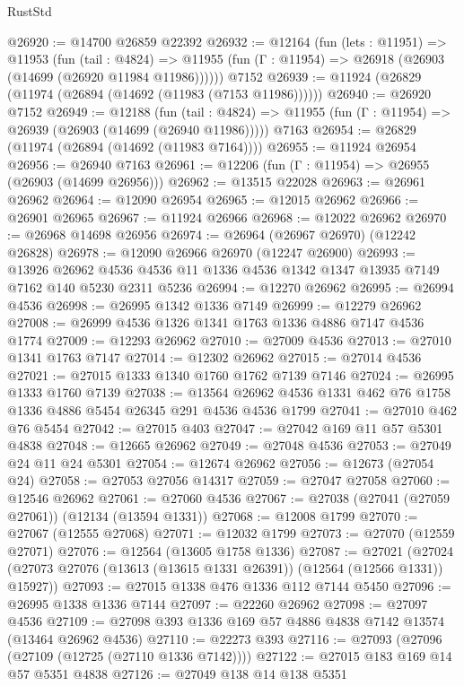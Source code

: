 \begin{lexlean}{RustStd}
\begin{coremodule}
@26920 := @14700 @26859 @22392
@26932 := @12164
    (fun (lets : @11951) =>
    @11953
      (fun (tail : @4824) =>
      @11955 (fun (Γ : @11954) => @26918 (@26903 (@14699 (@26920 @11984 @11986))))))
    @7152
@26939 := @11924 (@26829 (@11974 (@26894 (@14692 (@11983 (@7153 @11986))))))
@26940 := @26920 @7152
@26949 := @12188
    (fun (tail : @4824) => @11955 (fun (Γ : @11954) => @26939 (@26903 (@14699 (@26940 @11986)))))
    @7163
@26954 := @26829 (@11974 (@26894 (@14692 (@11983 @7164))))
@26955 := @11924 @26954
@26956 := @26940 @7163
@26961 := @12206 (fun (Γ : @11954) => @26955 (@26903 (@14699 @26956)))
@26962 := @13515 @22028
@26963 := @26961 @26962
@26964 := @12090 @26954
@26965 := @12015 @26962
@26966 := @26901 @26965
@26967 := @11924 @26966
@26968 := @12022 @26962
@26970 := @26968 @14698 @26956
@26974 := @26964 (@26967 @26970) (@12242 @26828)
@26978 := @12090 @26966 @26970 (@12247 @26900)
@26993 := @13926
    @26962
    @4536
    @4536
    @11
    @1336
    @4536
    @1342
    @1347
    @13935
    @7149
    @7162
    @140
    @5230
    @2311
    @5236
@26994 := @12270 @26962
@26995 := @26994 @4536
@26998 := @26995 @1342 @1336 @7149
@26999 := @12279 @26962
@27008 := @26999 @4536 @1326 @1341 @1763 @1336 @4886 @7147 @4536 @1774
@27009 := @12293 @26962
@27010 := @27009 @4536
@27013 := @27010 @1341 @1763 @7147
@27014 := @12302 @26962
@27015 := @27014 @4536
@27021 := @27015 @1333 @1340 @1760 @1762 @7139 @7146
@27024 := @26995 @1333 @1760 @7139
@27038 := @13564 @26962 @4536 @1331 @462 @76 @1758 @1336 @4886 @5454 @26345 @291 @4536 @4536 @1799
@27041 := @27010 @462 @76 @5454
@27042 := @27015 @403
@27047 := @27042 @169 @11 @57 @5301 @4838
@27048 := @12665 @26962
@27049 := @27048 @4536
@27053 := @27049 @24 @11 @24 @5301
@27054 := @12674 @26962
@27056 := @12673 (@27054 @24)
@27058 := @27053 @27056 @14317
@27059 := @27047 @27058
@27060 := @12546 @26962
@27061 := @27060 @4536
@27067 := @27038 (@27041 (@27059 @27061)) (@12134 (@13594 @1331))
@27068 := @12008 @1799
@27070 := @27067 (@12555 @27068)
@27071 := @12032 @1799
@27073 := @27070 (@12559 @27071)
@27076 := @12564 (@13605 @1758 @1336)
@27087 := @27021
    (@27024 (@27073 @27076 (@13613 (@13615 @1331 @26391)) (@12564 (@12566 @1331)) @15927))
@27093 := @27015 @1338 @476 @1336 @112 @7144 @5450
@27096 := @26995 @1338 @1336 @7144
@27097 := @22260 @26962
@27098 := @27097 @4536
@27109 := @27098 @393 @1336 @169 @57 @4886 @4838 @7142 @13574 (@13464 @26962 @4536)
@27110 := @22273 @393
@27116 := @27093 (@27096 (@27109 (@12725 (@27110 @1336 @7142))))
@27122 := @27015 @183 @169 @14 @57 @5351 @4838
@27126 := @27049 @138 @14 @138 @5351

\end{coremodule}
\end{lexlean}
